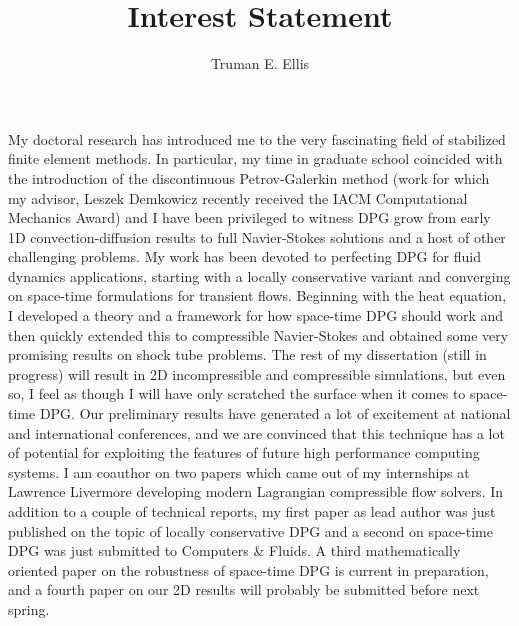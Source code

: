 \documentclass[12pt,letterpaper]{article}
\title{Interest Statement}
\author{Truman E. Ellis}
\date{}
\begin{document}
\maketitle


My doctoral research has introduced me to the very fascinating field of stabilized finite element methods.
In particular, my time in graduate school coincided with the introduction of the discontinuous Petrov-Galerkin method 
(work for which my advisor, Leszek Demkowicz recently received the IACM Computational Mechanics Award)
and I have been privileged to witness DPG grow from early 1D convection-diffusion results to 
full Navier-Stokes solutions and a host of other challenging problems.
My work has been devoted to perfecting DPG for fluid dynamics applications, starting with a locally conservative variant and 
converging on space-time formulations for transient flows.
Beginning with the heat equation, I developed a theory and a framework for how space-time DPG should work and then quickly extended this to compressible
Navier-Stokes and obtained some very promising results on shock tube problems.
The rest of my dissertation (still in progress) will result in 2D incompressible and compressible simulations, but
even so, I feel as though I will have only scratched the surface when it comes to space-time DPG.
Our preliminary results have generated a lot of excitement at national and international conferences,
and we are convinced that this technique has a lot of potential for exploiting the features of future high performance computing systems.
I am coauthor on two papers which came out of my internships at Lawrence Livermore developing modern Lagrangian compressible flow solvers.
In addition to a couple of technical reports, my first paper as lead author was just published on the topic of locally conservative DPG 
and a second on space-time DPG was just submitted to Computers \& Fluids.
A third mathematically oriented paper on the robustness of space-time DPG is current in preparation,
and a fourth paper on our 2D results will probably be submitted before next spring.
\end{document}
